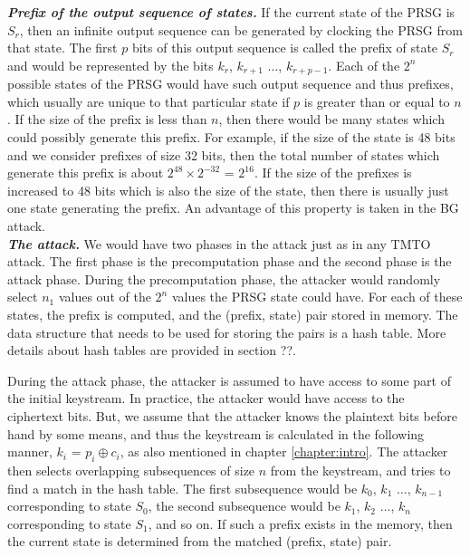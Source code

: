 \textit{\textbf{Prefix of the output sequence of states.}} If the current state of the PRSG is $S_r$, then an infinite output sequence can be generated by clocking the PRSG from that state. The first $p$ bits of this output sequence is called the prefix of state $S_r$ and would be represented by the bits $k_r$, $k_{r+1}$ $\ldots$, $k_{r+p-1}$. Each of the $2^n$ possible states of the PRSG would have such output sequence and thus prefixes, which usually are unique to that particular state if $p$ is greater than or equal to $n$ \cite{}. If the size of the prefix is less than $n$, then there would be many states which could possibly generate this prefix. For example, if the size of the state is 48 bits and we consider prefixes of size 32 bits, then the total number of states which generate this prefix is about $2^{48} \times 2^{-32}$ = $2^{16}$. If the size of the prefixes is increased to 48 bits which is also the size of the state, then there is usually just one state generating the prefix. An advantage of this property is taken in the BG attack.\\

\textit{\textbf{The attack.}} We would have two phases in the attack just as in any TMTO attack. The first phase is the precomputation phase and the second phase is the attack phase. During the precomputation phase, the attacker would randomly select $n_1$ values out of the $2^n$ values the PRSG state could have. For each of these states, the prefix is computed, and the (prefix, state) pair stored in memory. The data structure that needs to be used for storing the pairs is a hash table. More details about hash tables are provided in section ??.

During the attack phase, the attacker is assumed to have access to some part of the initial keystream. In practice, the attacker would have access to the ciphertext bits. But, we assume that the attacker knows the plaintext bits before hand by some means, and thus the keystream is calculated in the following manner, $k_i$ = $p_i \oplus c_i$, as also mentioned in chapter \ref{chapter:intro}. The attacker then selects overlapping subsequences of size $n$ from the keystream, and tries to find a match in the hash table. The first subsequence would be $k_0$, $k_1$ $\ldots$, $k_{n-1}$ corresponding to state $S_0$, the second subsequence would be $k_1$, $k_2$ $\ldots$, $k_{n}$ corresponding to state $S_1$, and so on. If such a prefix exists in the memory, then the current state is determined from the matched (prefix, state) pair.\\

